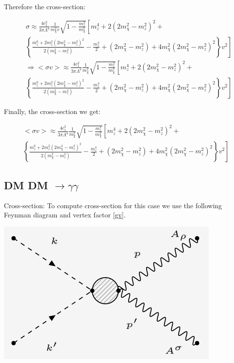 \documentclass[12pt]{report}
\begin{document}
Therefore the cross-section:

\begin{align*}
&\sigma  \approx \frac{4c^2_1}{3\pi \Lambda^4}  \frac{1}{m^2_\chi v}  \sqrt{1-\frac{m^2_z}{m^2_\chi}} \left[ m^4_z + 2(2 m^2_\chi -m^2_z)^2 + \right.\\
& \left. \left\{ \frac{ m^6_z+2 m^2_z (2 m^2_\chi - m^2_z)^2 }{2(m^2_\chi - m^2_z)} -\frac{m^4_z}{2} + (2 m^2_\chi - m^2_z) + 4 m^2_\chi (2 m^2_\chi - m^2_z)^2 \right\} v^2  \right]\\
&\Rightarrow <\sigma v> \approx \frac{4c^2_1}{3 \pi \Lambda^4}  \frac{1}{m^2_\chi}  \sqrt{1-\frac{m^2_z}{m^2_\chi}} \left[ m^4_z + 2(2 m^2_\chi -m^2_z)^2 + \right.\\
& \left. \left\{ \frac{ m^6_z+2 m^2_z (2 m^2_\chi - m^2_z)^2 }{2(m^2_\chi - m^2_z)} -\frac{m^4_z}{2} + (2 m^2_\chi - m^2_z) + 4 m^2_\chi (2 m^2_\chi - m^2_z)^2 \right\} v^2  \right]  
\end{align*}

Finally, the cross-section we get:

\begin{multline}
<\sigma v> \approx \frac{4c^2_1}{3 \pi \Lambda^4}  \frac{1}{m^2_\chi}  \sqrt{1-\frac{m^2_z}{m^2_\chi}} \left[ m^4_z + 2(2 m^2_\chi -m^2_z)^2 + \right.\\
\left. \left\{ \frac{ m^6_z+2 m^2_z (2 m^2_\chi - m^2_z)^2 }{2(m^2_\chi - m^2_z)} -\frac{m^4_z}{2} + (2 m^2_\chi - m^2_z) + 4 m^2_\chi (2 m^2_\chi - m^2_z)^2 \right\} v^2  \right] \label{zzcross}  
\end{multline}


\newpage


\subsection{DM DM $\longrightarrow \gamma \gamma$}

Cross-section: To compute cross-section for this case we use the following Feynman diagram and vertex factor \ref{gv}.

\begin{center}
\includegraphics[scale=0.5]{GG.png}
\end{center}
\end{document}
